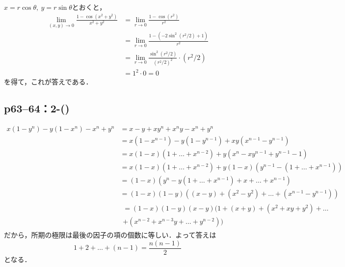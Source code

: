 \begin{tanswer}
    $x=r \cos \theta,~y=r\sin \theta$とおくと，
    \begin{align*}
        \lim_{(x,y)\to 0} \frac{1-\cos (x^2+y^2)}{x^2+y^2} & = \lim_{r \to 0} \frac{1-\cos (r^2)}{r^2}                       \\
                                                           & =\lim_{r \to 0} \frac{1-(-2\sin ^2 (r^2/2)+1)}{r^2}             \\
                                                           & =\lim_{r \to 0} \frac{\sin ^2 (r^2/2)}{(r^2/2)^2} \cdot (r^2/2) \\
                                                           & = 1^2 \cdot 0 =0
    \end{align*}
    を得て，これが答えである．
\end{tanswer}

\subsection*{p63--64：2-()}

\begin{tanswer}
    \begin{align*}
        x(1-y^n)-y(1-x^n)-x^n+y^n
         & = x-y+xy^n+x^ny-x^n+y^n                                     \\
         & = x(1-x^{n-1})-y(1-y^{n-1})+xy(x^{n-1}-y^{n-1})             \\
         & = x(1-x)(1+\dots+x^{n-2})+y(x^n-xy^{n-1}+y^{n-1}-1)         \\
         & = x(1-x)(1+\dots+x^{n-2})+y(1-x)(y^{n-1}-(1+\dots+x^{n-1})) \\
         & = (1-x)(y^n-y(1+\dots+x^{n-1})+x+\dots+x^{n-1})             \\
         & = (1-x)(1-y)((x-y)+(x^2-y^2)+\dots+(x^{n-1}-y^{n-1}))       \\
         &
        \begin{multlined}
            = (1-x)(1-y)(x-y)(1+(x+y)+(x^2+xy+y^2)+\dots \\
            +(x^{n-2}+x^{n-3}y+\dots+y^{n-2}))
        \end{multlined}
    \end{align*}
    だから，所期の極限は最後の因子の項の個数に等しい．よって答えは
    \[
        1+2+\ldots+(n-1) = \frac{n(n-1)}{2}
    \]
    となる．
\end{tanswer}


